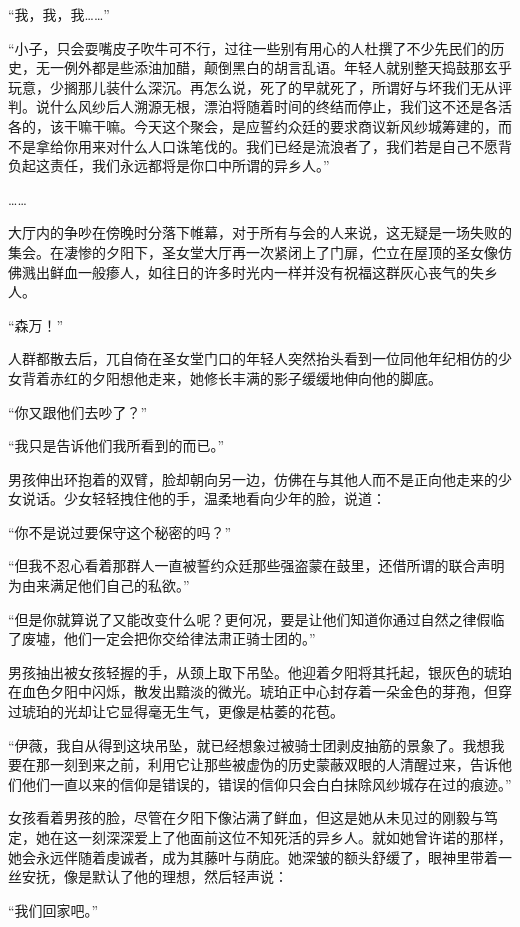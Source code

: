 “我，我，我……”

“小子，只会耍嘴皮子吹牛可不行，过往一些别有用心的人杜撰了不少先民们的历史，无一例外都是些添油加醋，颠倒黑白的胡言乱语。年轻人就别整天捣鼓那玄乎玩意，少搁那儿装什么深沉。再怎么说，死了的早就死了，所谓好与坏我们无从评判。说什么风纱后人溯源无根，漂泊将随着时间的终结而停止，我们这不还是各活各的，该干嘛干嘛。今天这个聚会，是应誓约众廷的要求商议新风纱城筹建的，而不是拿给你用来对什么人口诛笔伐的。我们已经是流浪者了，我们若是自己不愿背负起这责任，我们永远都将是你口中所谓的异乡人。”

……

大厅内的争吵在傍晚时分落下帷幕，对于所有与会的人来说，这无疑是一场失败的集会。在凄惨的夕阳下，圣女堂大厅再一次紧闭上了门扉，伫立在屋顶的圣女像仿佛溅出鲜血一般瘆人，如往日的许多时光内一样并没有祝福这群灰心丧气的失乡人。

“森万！”

人群都散去后，兀自倚在圣女堂门口的年轻人突然抬头看到一位同他年纪相仿的少女背着赤红的夕阳想他走来，她修长丰满的影子缓缓地伸向他的脚底。

“你又跟他们去吵了？”

“我只是告诉他们我所看到的而已。”

男孩伸出环抱着的双臂，脸却朝向另一边，仿佛在与其他人而不是正向他走来的少女说话。少女轻轻拽住他的手，温柔地看向少年的脸，说道：

“你不是说过要保守这个秘密的吗？”

“但我不忍心看着那群人一直被誓约众廷那些强盗蒙在鼓里，还借所谓的联合声明为由来满足他们自己的私欲。”

“但是你就算说了又能改变什么呢？更何况，要是让他们知道你通过自然之律假临了废墟，他们一定会把你交给律法肃正骑士团的。”

男孩抽出被女孩轻握的手，从颈上取下吊坠。他迎着夕阳将其托起，银灰色的琥珀在血色夕阳中闪烁，散发出黯淡的微光。琥珀正中心封存着一朵金色的芽孢，但穿过琥珀的光却让它显得毫无生气，更像是枯萎的花苞。

“伊薇，我自从得到这块吊坠，就已经想象过被骑士团剥皮抽筋的景象了。我想我要在那一刻到来之前，利用它让那些被虚伪的历史蒙蔽双眼的人清醒过来，告诉他们他们一直以来的信仰是错误的，错误的信仰只会白白抹除风纱城存在过的痕迹。”

女孩看着男孩的脸，尽管在夕阳下像沾满了鲜血，但这是她从未见过的刚毅与笃定，她在这一刻深深爱上了他面前这位不知死活的异乡人。就如她曾许诺的那样，她会永远伴随着虔诚者，成为其藤叶与荫庇。她深皱的额头舒缓了，眼神里带着一丝安抚，像是默认了他的理想，然后轻声说：

“我们回家吧。”


